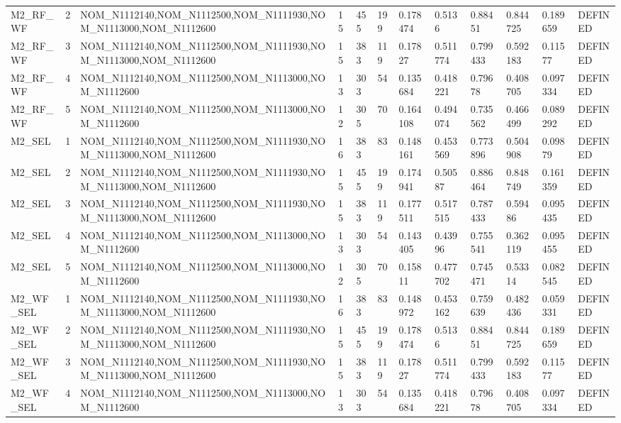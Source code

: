 \begin{table}[ht]
\begin{tabular}{llllllllllll}
M2\_RF\_WF & 2 & NOM\_N1112140,NOM\_N1112500,NOM\_N1111930,NOM\_N1113000,NOM\_N1112600 & 15 & 455 & 199 & 0.178474 & 0.5136 & 0.88451 & 0.844725 & 0.189659 & DEFINED \\
M2\_RF\_WF & 3 & NOM\_N1112140,NOM\_N1112500,NOM\_N1111930,NOM\_N1113000,NOM\_N1112600 & 15 & 383 & 119 & 0.17827 & 0.511774 & 0.799433 & 0.592183 & 0.11577 & DEFINED \\
M2\_RF\_WF & 4 & NOM\_N1112140,NOM\_N1112500,NOM\_N1113000,NOM\_N1112600 & 13 & 303 & 54 & 0.135684 & 0.418221 & 0.79678 & 0.408705 & 0.097334 & DEFINED \\
M2\_RF\_WF & 5 & NOM\_N1112140,NOM\_N1112500,NOM\_N1113000,NOM\_N1112600 & 12 & 305 & 70 & 0.164108 & 0.494074 & 0.735562 & 0.466499 & 0.089292 & DEFINED \\
M2\_SEL & 1 & NOM\_N1112140,NOM\_N1112500,NOM\_N1111930,NOM\_N1113000,NOM\_N1112600 & 16 & 383 & 83 & 0.148161 & 0.453569 & 0.773896 & 0.504908 & 0.09879 & DEFINED \\
M2\_SEL & 2 & NOM\_N1112140,NOM\_N1112500,NOM\_N1111930,NOM\_N1113000,NOM\_N1112600 & 15 & 455 & 199 & 0.174941 & 0.50587 & 0.886464 & 0.848749 & 0.161359 & DEFINED \\
M2\_SEL & 3 & NOM\_N1112140,NOM\_N1112500,NOM\_N1111930,NOM\_N1113000,NOM\_N1112600 & 15 & 383 & 119 & 0.177511 & 0.517515 & 0.787433 & 0.59486 & 0.095435 & DEFINED \\
M2\_SEL & 4 & NOM\_N1112140,NOM\_N1112500,NOM\_N1113000,NOM\_N1112600 & 13 & 303 & 54 & 0.143405 & 0.43996 & 0.755541 & 0.362119 & 0.095455 & DEFINED \\
M2\_SEL & 5 & NOM\_N1112140,NOM\_N1112500,NOM\_N1113000,NOM\_N1112600 & 12 & 305 & 70 & 0.15811 & 0.477702 & 0.745471 & 0.53314 & 0.082545 & DEFINED \\
M2\_WF\_SEL & 1 & NOM\_N1112140,NOM\_N1112500,NOM\_N1111930,NOM\_N1113000,NOM\_N1112600 & 16 & 383 & 83 & 0.148972 & 0.453162 & 0.759639 & 0.482436 & 0.059331 & DEFINED \\
M2\_WF\_SEL & 2 & NOM\_N1112140,NOM\_N1112500,NOM\_N1111930,NOM\_N1113000,NOM\_N1112600 & 15 & 455 & 199 & 0.178474 & 0.5136 & 0.88451 & 0.844725 & 0.189659 & DEFINED \\
M2\_WF\_SEL & 3 & NOM\_N1112140,NOM\_N1112500,NOM\_N1111930,NOM\_N1113000,NOM\_N1112600 & 15 & 383 & 119 & 0.17827 & 0.511774 & 0.799433 & 0.592183 & 0.11577 & DEFINED \\
M2\_WF\_SEL & 4 & NOM\_N1112140,NOM\_N1112500,NOM\_N1113000,NOM\_N1112600 & 13 & 303 & 54 & 0.135684 & 0.418221 & 0.79678 & 0.408705 & 0.097334 & DEFINED \\

\end{tabular}
\end{table}

